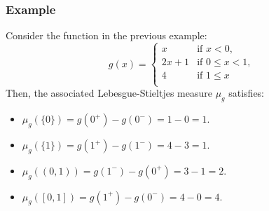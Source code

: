 \documentclass[11pt]{article}
\begin{document}
\subsubsection*{Example}
Consider the function in the previous example:
\[g(x) = \begin{cases}
    x & \text{if } x < 0, \\
    2x + 1 & \text{if } 0 \leq x < 1, \\
    4 & \text{if } 1 \leq x \\
\end{cases}\]
Then, the associated Lebesgue-Stieltjes measure \(\mu_g\) satisfies:
\begin{itemize}
    \item \(\mu_g(\{0\}) = g(0^+) - g(0^-) = 1 - 0 = 1\).
    \item \(\mu_g(\{1\}) = g(1^+) - g(1^-) = 4 - 3 = 1\).
    \item \(\mu_g((0, 1)) = g(1^-) - g(0^+) = 3 - 1 = 2\).
    \item \(\mu_g([0, 1]) = g(1^+) - g(0^-) = 4 - 0 = 4\).
\end{itemize}
\end{document}
